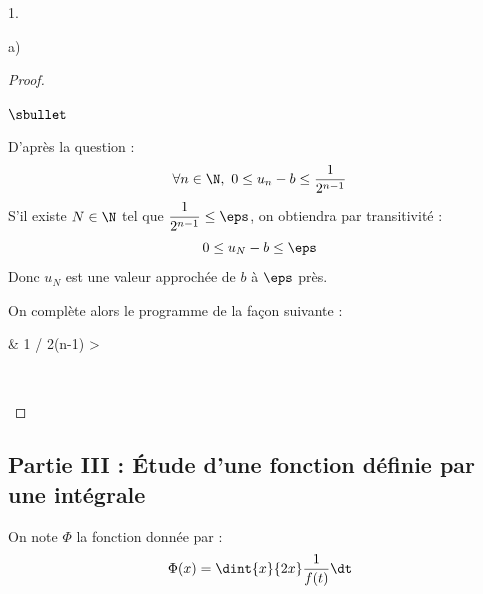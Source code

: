 \documentclass[11pt]{article}%
\begin{document}
\begin{noliste}{1.}
\begin{noliste}{a)}
    
    
    
    \begin{proof}~
     \begin{noliste}{$\sbullet$}
      \item D'après la question  :
      \[
        \forall n \in \N, \ 0 \leq u_n - b \leq \dfrac{1}{2^{n-1}}
      \]
      S'il existe $N\in \N$ tel que $\dfrac{1}{2^{n-1}} \leq \eps$, on 
      obtiendra par transitivité :
      \[
        0 \leq u_N-b \leq \eps
      \]
      Donc $u_N$ est une valeur approchée de $b$ à $\eps$ près.
      
%       
      \item On complète alors le programme \Scilab{} de la façon 
      suivante :
      \begin{scilabC}{2}
        & \qquad {} 1 / 2\puis{}(n-1) > 
      \end{scilabC}~\\[-1.4cm]
     \end{noliste}
    \end{proof}
  \end{noliste}
\end{noliste}



\subsection*{Partie III : Étude d'une fonction définie par une 
intégrale}

\noindent
On note $\Phi$ la fonction donnée par :
\[
  \Phi(x) = \dint{x}{2x} \dfrac{1}{f(t)} \dt
\]
\end{document}
